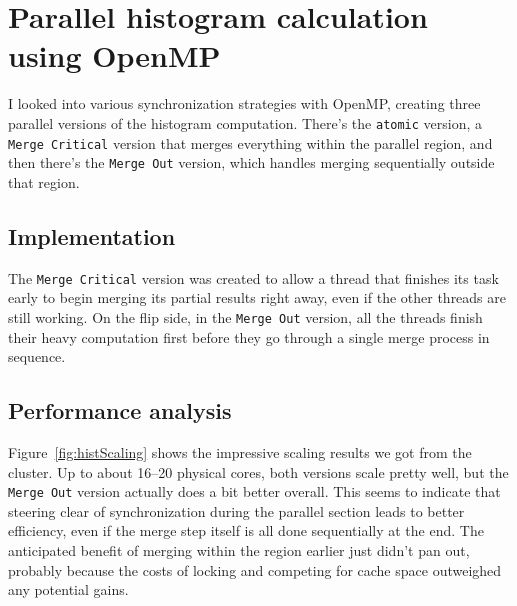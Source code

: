 \section{Parallel histogram calculation using OpenMP }

I looked into various synchronization strategies with OpenMP, creating three parallel versions of the histogram computation. There’s the \texttt{atomic} version, a \texttt{Merge Critical} version that merges everything within the parallel region, and then there’s the \texttt{Merge Out} version, which handles merging sequentially outside that region.

\subsection*{Implementation}







The \texttt{Merge Critical} version was created to allow a thread that finishes its task early to begin merging its partial results right away, even if the other threads are still working. On the flip side, in the \texttt{Merge Out} version, all the threads finish their heavy computation first before they go through a single merge process in sequence.

\subsection*{Performance analysis}
Figure~\ref{fig:histScaling} shows the impressive scaling results we got from the cluster. Up to about 16–20 physical cores, both versions scale pretty well, but the \texttt{Merge Out} version actually does a bit better overall. This seems to indicate that steering clear of synchronization during the parallel section leads to better efficiency, even if the merge step itself is all done sequentially at the end. The anticipated benefit of merging within the region earlier just didn’t pan out, probably because the costs of locking and competing for cache space outweighed any potential gains.

